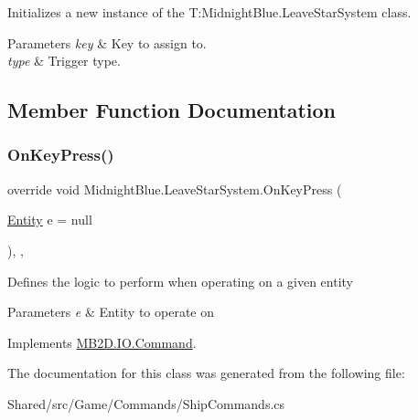 Initializes a new instance of the T\+:\+Midnight\+Blue.\+Leave\+Star\+System class. 


\begin{DoxyParams}{Parameters}
{\em key} & Key to assign to.\\
\hline
{\em type} & Trigger type.\\
\hline
\end{DoxyParams}


\subsection{Member Function Documentation}
\hypertarget{class_midnight_blue_1_1_leave_star_system_ad2e048edbe7a4816d9ed8fc87cf4eb91}{}\label{class_midnight_blue_1_1_leave_star_system_ad2e048edbe7a4816d9ed8fc87cf4eb91} 
\subsubsection{\texorpdfstring{On\+Key\+Press()}{OnKeyPress()}}
{\footnotesize\ttfamily override void Midnight\+Blue.\+Leave\+Star\+System.\+On\+Key\+Press (\begin{DoxyParamCaption}\item[{\hyperlink{class_m_b2_d_1_1_entity_component_1_1_entity}{Entity}}]{e = {\ttfamily null} }\end{DoxyParamCaption})\hspace{0.3cm}{\ttfamily [inline]}, {\ttfamily [protected]}, {\ttfamily [virtual]}}



Defines the logic to perform when operating on a given entity 


\begin{DoxyParams}{Parameters}
{\em e} & Entity to operate on\\
\hline
\end{DoxyParams}


Implements \hyperlink{class_m_b2_d_1_1_i_o_1_1_command_ae927e36c0e285848325cc68eddb5fd72}{M\+B2\+D.\+I\+O.\+Command}.



The documentation for this class was generated from the following file\+:\begin{DoxyCompactItemize}
\item 
Shared/src/\+Game/\+Commands/Ship\+Commands.\+cs\end{DoxyCompactItemize}
